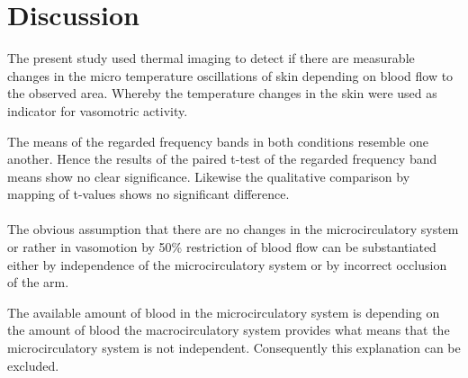 \chapter{Discussion}

The present study used thermal imaging to detect if there are measurable changes in the micro temperature oscillations of skin depending on blood flow to the observed area. Whereby the temperature changes in the skin were used as indicator for vasomotric activity. %

The means of the regarded frequency bands in both conditions resemble one another. Hence the results of the paired t-test of the regarded frequency band means show no clear significance. Likewise the qualitative comparison by mapping of t-values shows no significant difference. %
\\
\\
The obvious assumption that there are no changes in the microcirculatory system or rather in vasomotion by 50\% restriction of blood flow can be substantiated either by independence of the microcirculatory system or by incorrect occlusion of the arm.

The available amount of blood in the microcirculatory system is depending on the amount of blood the macrocirculatory system provides what means that the microcirculatory system is not independent. Consequently this explanation can be excluded.

